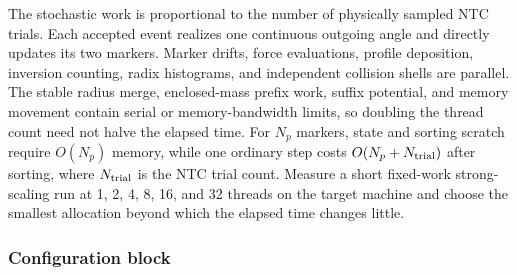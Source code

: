 The stochastic work is proportional to the number of physically sampled NTC
trials.  Each accepted event realizes one continuous outgoing angle and
directly updates its two markers.  Marker drifts, force evaluations, profile
deposition, inversion counting, radix histograms, and independent collision
shells are parallel.  The stable radius merge, enclosed-mass prefix work,
suffix potential, and memory movement contain serial or memory-bandwidth
limits, so doubling the thread count need not halve the elapsed time.  For
\(N_p\) markers, state and sorting scratch require \(O(N_p)\) memory, while
one ordinary step costs \(O(N_p+N_{\rm trial})\) after sorting, where
\(N_{\rm trial}\) is the NTC trial count.  Measure a short fixed-work
strong-scaling run at 1, 2, 4, 8, 16, and 32 threads on the target machine and
choose the smallest allocation beyond which the elapsed time changes little.

\subsubsection{Configuration block}

